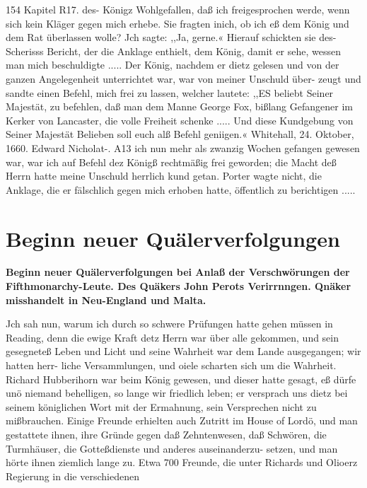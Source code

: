 154 Kapitel R17.
des- Königz Wohlgefallen, daß ich freigesprochen werde, wenn sich
kein Kläger gegen mich erhebe. Sie fragten inich, ob ich eß dem
König und dem Rat überlassen wolle? Jch sagte: ,,Ja, gerne.«
Hierauf schickten sie des- Scherisss Bericht, der die Anklage enthielt,
dem König, damit er sehe, wessen man mich beschuldigte .....
Der König, nachdem er dietz gelesen und von der ganzen
Angelegenheit unterrichtet war, war von meiner Unschuld über-
zeugt und sandte einen Befehl, mich frei zu lassen, welcher lautete:
,,ES beliebt Seiner Majestät, zu befehlen, daß man dem Manne
George Fox, bißlang Gefangener im Kerker von Lancaster, die
volle Freiheit schenke ..... Und diese Kundgebung von Seiner
Majestät Belieben soll euch alß Befehl geniigen.«
Whitehall, 24. Oktober, 1660. Edward Nicholat-.
A13 ich nun mehr als zwanzig Wochen gefangen gewesen
war, war ich auf Befehl dez Königß rechtmäßig frei geworden;
die Macht deß Herrn hatte meine Unschuld herrlich kund getan.
Porter wagte nicht, die Anklage, die er fälschlich gegen mich
erhoben hatte, öffentlich zu berichtigen .....


\chapter[Beginn neuer Quälerverfolgungen]{Beginn neuer Quälerverfolgungen}

\begin{center}
\textbf{Beginn neuer Quälerverfolgungen bei Anlaß der Verschwörungen
der Fifthmonarchy-Leute. Des Quäkers John Perots Verirrnngen.
Qnäker misshandelt in Neu-England und Malta.}
\end{center}




Jch sah nun, warum ich durch so schwere Prüfungen hatte
gehen müssen in Reading, denn die ewige Kraft detz Herrn war
über alle gekommen, und sein gesegneteß Leben und Licht und
seine Wahrheit war dem Lande ausgegangen; wir hatten herr-
liche Versammlungen, und oiele scharten sich um die Wahrheit.
Richard Hubberihorn war beim König gewesen, und dieser hatte
gesagt, eß dürfe unö niemand behelligen, so lange wir friedlich
leben; er versprach uns dietz bei seinem königlichen Wort mit der
Ermahnung, sein Versprechen nicht zu mißbrauchen. Einige
Freunde erhielten auch Zutritt im House of Lordö, und man
gestattete ihnen, ihre Gründe gegen daß Zehntenwesen, daß Schwören,
die Turmhäuser, die Gotteßdienste und anderes auseinanderzu-
setzen, und man hörte ihnen ziemlich lange zu. Etwa 700 Freunde,
die unter Richards und Olioerz Regierung in die verschiedenen


